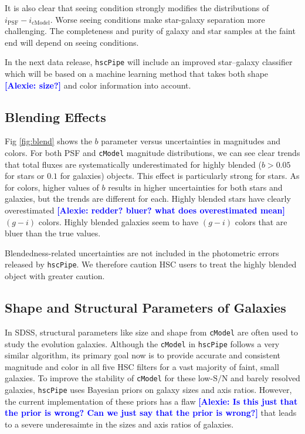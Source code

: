 \documentclass[useamsfonts]{pasj01}
\newcommand{\alexie}[1]{\textcolor{blue}{\textbf{[Alexie: #1]}}}
\def\hscpipe{\texttt{hscPipe}}
\def\cmodel{\texttt{cModel}}
\def\s2n{{$\mathrm{S}/\mathrm{N}$}}
\begin{document}
    It is also clear that seeing condition strongly modifies the distributions
    of $i_{\mathrm{PSF}}-i_{\mathrm{cModel}}$. Worse seeing conditions make star-galaxy separation more challenging. The completeness and purity of galaxy and star samples at the faint end will depend on seeing conditions.  

    In the next data release, \hscpipe{} will include an improved star--galaxy classifier which will be based on a machine learning method that takes both shape \alexie{size?} and color 
    information into account. 

\subsection{Blending Effects}
    \label{ssec:blendedness}

 Fig \ref{fig:blend} shows the $b$ parameter versus uncertainties in magnitudes and colors. For both PSF and \cmodel{} magnitude distributions, we can see clear trends that 
    total fluxes are systematically underestimated for highly blended ($b>0.05$ for 
    stars or $0.1$ for galaxies) objects.
    This effect is particularly strong for stars.
    As for colors, higher values of $b$ results in higher uncertainties for both
    stars and galaxies, but the trends are different for each.
    Highly blended stars have clearly overestimated \alexie{redder? bluer? what does overestimated mean} $(g-i)$ colors. Highly blended galaxies seem to have  $(g-i)$ colors that are bluer than the 
    true values.

    Blendedness-related uncertainties are not included in the photometric errors 
    released by \hscpipe{}.
    We therefore caution HSC users to treat the highly blended object with
    greater caution.

\subsection{Shape and Structural Parameters of Galaxies}
    \label{ssec:shape}

    In SDSS,  structural parameters like size and shape from \cmodel{} are often
    used to study the evolution galaxies.
    Although the \cmodel{} in \hscpipe{} follows a very similar algorithm, its primary
    goal now is to provide accurate and consistent magnitude and color in all five
    HSC filters for a vast majority of faint, small galaxies.
    To improve the stability of \cmodel{} for these low-\s2n{} and barely resolved
    galaxies, \hscpipe{} uses Bayesian priors on galaxy sizes and axis ratios. However, the current implementation of these priors has a flaw \alexie{Is this just that the prior is wrong? Can we just say that the prior is wrong?} that leads to a severe  underesaimte in the sizes and axis ratios of galaxies.
    
\end{document}
